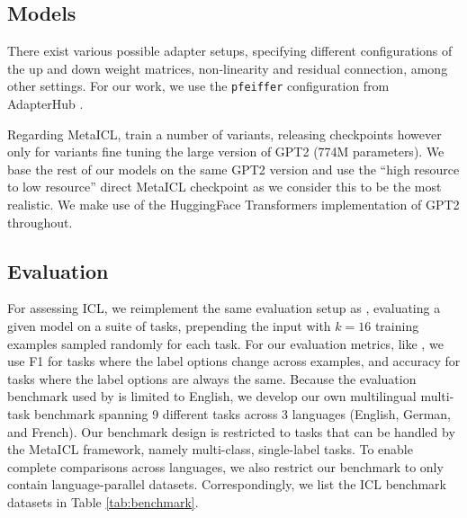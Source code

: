 \documentclass[11pt]{article}
\begin{document}
\subsection{Models}

There exist various possible adapter setups, specifying different configurations of the up and down
weight matrices, non-linearity and residual connection, among other settings. For our work, we use
the \verb_pfeiffer_ configuration from AdapterHub \citep{pfeiffer_adapterhub_2020}.

Regarding MetaICL, \citet{min_metaicl_2022} train a number of variants, releasing checkpoints
however only for variants fine tuning the large version of GPT2 (774M parameters). We base the rest
of our models on the same GPT2 version and use the ``high resource to low resource'' direct MetaICL
checkpoint as we consider this to be the most realistic. We make use of the HuggingFace Transformers
\citep{wolf_transformers_2020} implementation of GPT2 throughout.

\subsection{Evaluation}

For assessing ICL, we reimplement the same evaluation setup as \citet{min_metaicl_2022}, evaluating
a given model on a suite of tasks, prepending the input with $k=16$ training examples sampled
randomly for each task. For our evaluation metrics, like \citet{min_metaicl_2022}, we use F1 for
tasks where the label options change across examples, and accuracy for tasks where the label options
are always the same. Because the evaluation benchmark used by \citet{min_metaicl_2022} is limited to
English, we develop our own multilingual multi-task benchmark spanning 9 different tasks across
3 languages (English, German, and French). Our benchmark design is restricted to tasks that can be
handled by the MetaICL framework, namely multi-class, single-label tasks. To enable complete
comparisons across languages, we also restrict our benchmark to only contain language-parallel
datasets. Correspondingly, we list the ICL benchmark datasets in Table \ref{tab:benchmark}.
\end{document}
